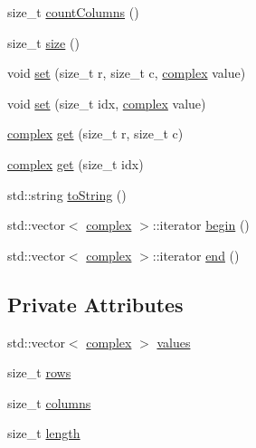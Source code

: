 \begin{DoxyCompactItemize}
\item 
size\+\_\+t \hyperlink{classqlib_1_1math_1_1matrix_a69ed708edf603637731e4f6fe46b0754}{count\+Columns} ()
\item 
size\+\_\+t \hyperlink{classqlib_1_1math_1_1matrix_a2f0ada8003cf2306534700502f598428}{size} ()
\item 
void \hyperlink{classqlib_1_1math_1_1matrix_a2d09bd42691acdbf315d5cbd7a698698}{set} (size\+\_\+t r, size\+\_\+t c, \hyperlink{classqlib_1_1math_1_1complex}{complex} value)
\item 
void \hyperlink{classqlib_1_1math_1_1matrix_ae97863a30bb445897ff63c77582a366a}{set} (size\+\_\+t idx, \hyperlink{classqlib_1_1math_1_1complex}{complex} value)
\item 
\hyperlink{classqlib_1_1math_1_1complex}{complex} \hyperlink{classqlib_1_1math_1_1matrix_a91fcadaccfcd68adb71de0da6f5d267f}{get} (size\+\_\+t r, size\+\_\+t c)
\item 
\hyperlink{classqlib_1_1math_1_1complex}{complex} \hyperlink{classqlib_1_1math_1_1matrix_a17dce2bfd8addcb026f6d9159134f1c7}{get} (size\+\_\+t idx)
\item 
std\+::string \hyperlink{classqlib_1_1math_1_1matrix_a06ec639a654b5319f4eb1bff591d6e7b}{to\+String} ()
\item 
std\+::vector$<$ \hyperlink{classqlib_1_1math_1_1complex}{complex} $>$\+::iterator \hyperlink{classqlib_1_1math_1_1matrix_a1cbe9185c4f147d821eeb0b36ed9cc86}{begin} ()
\item 
std\+::vector$<$ \hyperlink{classqlib_1_1math_1_1complex}{complex} $>$\+::iterator \hyperlink{classqlib_1_1math_1_1matrix_ae250bb5455fe71b836a5252335575545}{end} ()
\end{DoxyCompactItemize}
\subsection*{Private Attributes}
\begin{DoxyCompactItemize}
\item 
std\+::vector$<$ \hyperlink{classqlib_1_1math_1_1complex}{complex} $>$ \hyperlink{classqlib_1_1math_1_1matrix_ad764d65375ba1e50381f640bdc181c0b}{values}
\item 
size\+\_\+t \hyperlink{classqlib_1_1math_1_1matrix_af29b6ea4316eb972bbdc55da6e54dbb3}{rows}
\item 
size\+\_\+t \hyperlink{classqlib_1_1math_1_1matrix_ad3c2dd80c600d7bf37ae5bbdf5f056b8}{columns}
\item 
size\+\_\+t \hyperlink{classqlib_1_1math_1_1matrix_aef00292f85054708922acef6b7744a40}{length}
\end{DoxyCompactItemize}


